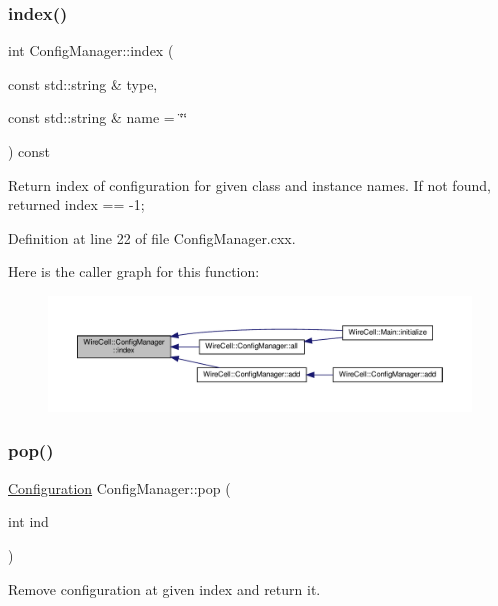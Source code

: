 \subsubsection{\texorpdfstring{index()}{index()}}
{\footnotesize\ttfamily int Config\+Manager\+::index (\begin{DoxyParamCaption}\item[{const std\+::string \&}]{type,  }\item[{const std\+::string \&}]{name = {\ttfamily \char`\"{}\char`\"{}} }\end{DoxyParamCaption}) const}

Return index of configuration for given class and instance names. If not found, returned index == -\/1; 

Definition at line 22 of file Config\+Manager.\+cxx.

Here is the caller graph for this function\+:
\nopagebreak
\begin{figure}[H]
\begin{center}
\leavevmode
\includegraphics[width=350pt]{class_wire_cell_1_1_config_manager_aca683be02b131cdab4a1a54aeb635206_icgraph}
\end{center}
\end{figure}
\mbox{\label{class_wire_cell_1_1_config_manager_a4168a64d0957e95cf64565ef8f74fbf8}} 
\subsubsection{\texorpdfstring{pop()}{pop()}}
{\footnotesize\ttfamily \hyperlink{namespace_wire_cell_a9f705541fc1d46c608b3d32c182333ee}{Configuration} Config\+Manager\+::pop (\begin{DoxyParamCaption}\item[{int}]{ind }\end{DoxyParamCaption})}



Remove configuration at given index and return it. 



